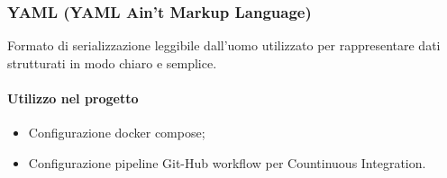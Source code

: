 \subsubsection{YAML (YAML Ain't Markup Language)}
Formato di serializzazione leggibile dall'uomo utilizzato per rappresentare dati strutturati in modo chiaro e semplice.

\paragraph{Utilizzo nel progetto}
\begin{itemize}
    \item Configurazione
    docker compose;
    \item Configurazione pipeline Git-Hub workflow per Countinuous Integration. 
\end{itemize}